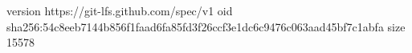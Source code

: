 version https://git-lfs.github.com/spec/v1
oid sha256:54c8eeb7144b856f1faad6fa85fd3f26ccf3e1dc6c9476c063aad45bf7c1abfa
size 15578
